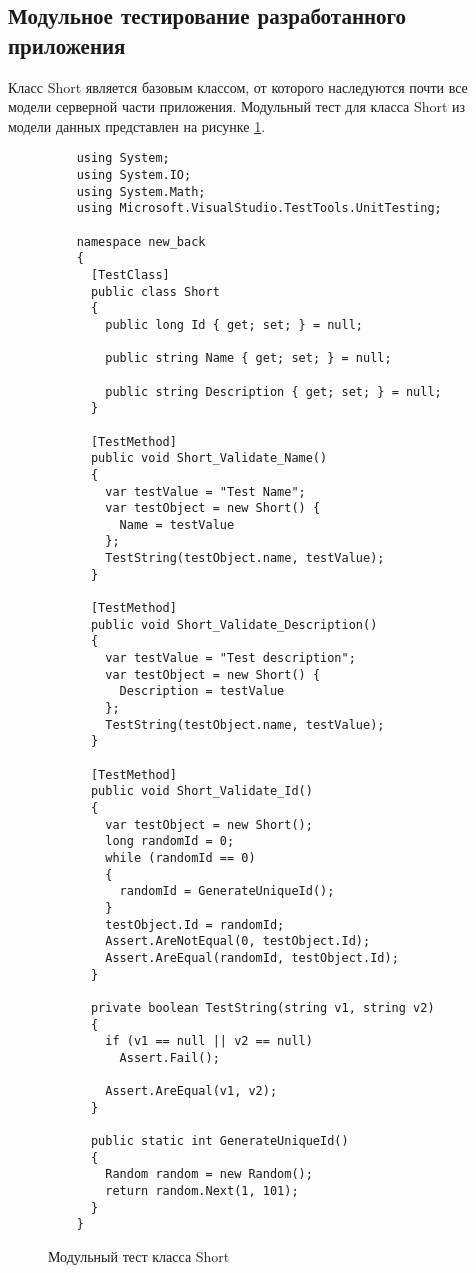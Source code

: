 \renewcommand{\arraystretch}{1.0} %

\subsection{Модульное тестирование разработанного приложения}

Класс Short является базовым классом, от которого наследуются почти все модели серверной части приложения. Модульный тест для класса Short из модели данных представлен на рисунке \ref{unitshort:image}.

\begin{figure}[ht]
\lstset{style=sharpc}
\begin{lstlisting}
    using System;
    using System.IO;
    using System.Math;
    using Microsoft.VisualStudio.TestTools.UnitTesting;
    
    namespace new_back
    {
      [TestClass]
      public class Short
      {
        public long Id { get; set; } = null;
    
        public string Name { get; set; } = null;
    
        public string Description { get; set; } = null;
      }
    
      [TestMethod]
      public void Short_Validate_Name() 
      { 
        var testValue = "Test Name";
        var testObject = new Short() { 
          Name = testValue
        };
        TestString(testObject.name, testValue); 
      } 
      
      [TestMethod]
      public void Short_Validate_Description() 
      { 
        var testValue = "Test description";
        var testObject = new Short() { 
          Description = testValue
        };
        TestString(testObject.name, testValue); 
      } 
      
      [TestMethod]
      public void Short_Validate_Id() 
      { 
        var testObject = new Short(); 
        long randomId = 0; 
        while (randomId == 0) 
        { 
          randomId = GenerateUniqueId(); 
        } 
        testObject.Id = randomId; 
        Assert.AreNotEqual(0, testObject.Id); 
        Assert.AreEqual(randomId, testObject.Id); 
      }
    
      private boolean TestString(string v1, string v2)
      {
        if (v1 == null || v2 == null)
          Assert.Fail();
          
        Assert.AreEqual(v1, v2);
      }
    
      public static int GenerateUniqueId()
      {
        Random random = new Random();
        return random.Next(1, 101);
      }
    }    
\end{lstlisting}  
\caption{Модульный тест класса Short}
\label{unitshort:image}
\end{figure}

